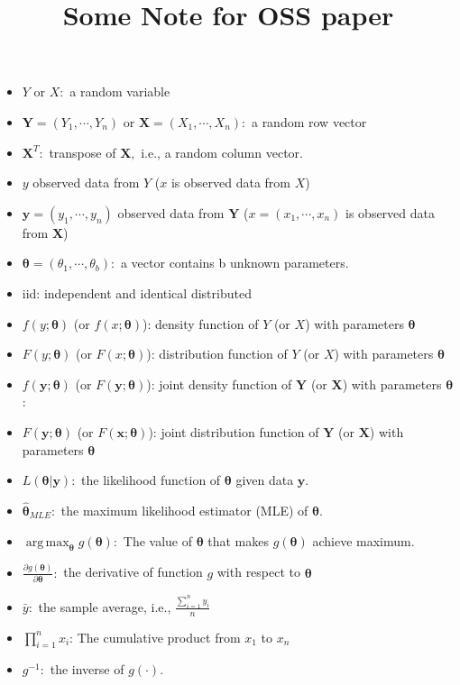 \documentclass[12pt]{article}
\title{Some Note for OSS paper}
\date{}
\author{}
\DeclareMathOperator*{\argmax}{arg\,max}
\begin{document}
\begin{itemize}
    \item $Y$ or $X:$ a random variable
    \item $\mathbf{Y} = (Y_{1}, \cdots, Y_{n})$ or $\mathbf{X} = (X_{1}, \cdots, X_{n}):$ a random row vector
    \item $\mathbf{X}^{T}:$ transpose of $\mathbf{X},$ i.e., a random column vector.
    \item $y$  observed data from $Y$ ($x$ is observed data from $X$)
    \item $\mathbf{y} = (y_{1}, \cdots, y_{n})$ observed data from $\mathbf{Y}$ ($x = (x_{1}, \cdots, x_{n})$ is observed data from $\mathbf{X}$)
    \item $\boldsymbol{\theta} = (\theta_{1}, \cdots, \theta_{b}):$ a vector contains b unknown parameters.
    \item iid: independent and identical distributed
    \item $f(y; \boldsymbol{\theta})$ (or $f(x; \boldsymbol{\theta})$): density function of $Y$ (or $X$) with parameters $\boldsymbol{\theta}$ 
    \item $F(y; \boldsymbol{\theta})$ (or $F(x; \boldsymbol{\theta})$): distribution function of $Y$ (or $X$) with parameters $\boldsymbol{\theta}$
    \item $f(\mathbf{y};\boldsymbol{\theta})$  (or $F(\mathbf{y};\boldsymbol{\theta})$): joint density function of $\mathbf{Y}$  (or $\mathbf{X}$) with parameters $\boldsymbol{\theta}$:
    \item $F(\mathbf{y}; \boldsymbol{\theta})$  (or $F(\mathbf{x}; \boldsymbol{\theta})$): joint distribution function of $\mathbf{Y}$  (or $\mathbf{X}$) with parameters $\boldsymbol{\theta}$
    \item $L(\boldsymbol{\theta}|\mathbf{y}):$ the likelihood function of $\boldsymbol{\theta}$ given data $\mathbf{y}$.
    \item $\hat{\boldsymbol{\theta}}_{MLE}:$ the maximum likelihood estimator (MLE) of $\boldsymbol{\theta}$.
    \item $\argmax_{\boldsymbol{\theta}} g(\boldsymbol{\theta}):$ The value of $\boldsymbol{\theta}$ that makes $g(\boldsymbol{\theta})$ achieve maximum.
    \item $\frac{\partial g(\boldsymbol{\theta})}{\partial \boldsymbol{\theta}}:$ the derivative of function $g$ with respect to $\boldsymbol{\theta}$
    \item $\bar{y}:$ the sample average, i.e., $\frac{\sum^{n}_{i=1}y_{i}}{n}$
    \item $\prod^{n}_{i=1}x_{i}$: The cumulative product from $x_{1}$ to $x_{n}$
    \item $g^{-1}:$ the inverse of $g(\cdot)$.
\end{itemize}
\end{document}
